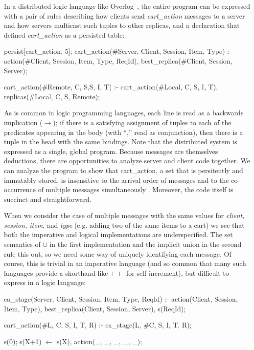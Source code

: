 In a distributed logic language like Overlog~\cite{boom-eurosys}, the entire program 
can be expressed with a pair of rules describing how clients send {\em cart\_action}
messages to a server and how servers multicast such tuples to other replicas, and 
a declaration that defined {\em cart\_action} as a persisted table:

\begin{Dedalus}
persist[cart_action, 5];
cart\_action(#Server, Client, Session, Item, Type) :-
  action(#Client, Session, Item, Type, ReqId),
  best_replica(#Client, Session, Server);

cart\_action(#Remote, C, S,S, I, T) :-
  cart\_action(#Local, C, S, I, T),
  replicas(#Local, C, S, Remote);
\end{Dedalus}

As is common in logic programming languages, each line is read as a backwards
implication ($\rightarrow$); if there is a satisfying assignment of tuples to each of
the predicates appearing in the body (with ``,'' read as conjunction), 
then there is a tuple in the head with the same bindings.
Note that the distributed system is expressed as a single, global program.
Because messages are themselves deductions, there are opportunities to 
analyze server and client code together.  We can analyze the program to 
show that cart\_action, a set that is persitently and immutably
stored, is insensitive to the arrival order of messages 
and to the co-occurrence of multiple messages simultaneously
. Moreover, the code 
itself is succinct and straightforward. 




When we consider the case of multiple messages with the same values for
{\em client, session, item}, and {\em type} (e.g. adding two of the same items to a cart)
we see that both the imperative and logical implementations are underspecified.
The set semantics of $\cup$ in the first implementation and the implicit union 
in the second rule this out, so we need some way of uniquely identifying each message.
Of course, this is trivial in an imperative language (and so common that many such languages
provide a shorthand like $++$ for self-increment), but difficult to express in a logic language:

\begin{Dedalus}
ca_stage(Server, Client, Session, Item, Type, ReqId) :-
  action(Client, Session, Item, Type),
  best_replica(Client, Session, Server),
  s(ReqId);

cart_action(#L, C, S, I, T, R) :-
  ca_stage(L, #C, S, I, T, R);

s(0);
s(X+1) \(\leftarrow\)  s(X), action(_, _, _, _, _);

\end{Dedalus}


